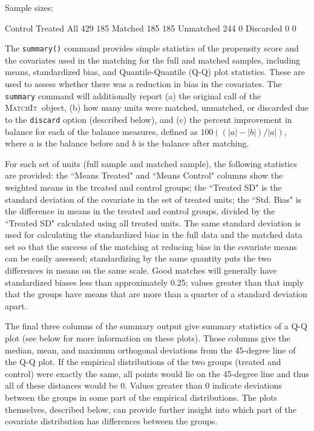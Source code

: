 \documentclass[oneside,letterpaper,titlepage]{article}
\newcommand{\MatchIt}{\textsc{MatchIt}}
\begin{document}
\begin{enumerate}
\begin{Schunk}
\begin{Soutput}
Sample sizes:

          Control Treated
All           429     185
Matched       185     185
Unmatched     244       0
Discarded       0       0
\end{Soutput}
\end{Schunk}

The \texttt{summary()} command provides simple statistics of the
propensity score and the covariates used in the matching for the full
and matched samples, including means, standardized bias, and
Quantile-Quantile (Q-Q) plot statistics.  These are used to assess
whether there was a reduction in bias in the covariates.  The
\texttt{summary} command will additionally report (a) the original
call of the \MatchIt\ object, (b) how many units were matched,
unmatched, or discarded due to the \texttt{discard} option (described
below), and (c) the percent improvement in balance for each of the
balance measures, defined as $100((|a|-|b|)/|a|)$, where $a$ is the
balance before and $b$ is the balance after matching.

For each set of units (full sample and matched sample), the following
statistics are provided: the ``Means Treated" and ``Means Control"
columns show the weighted means in the treated and control groups; the
``Treated SD" is the standard deviation of the covariate in the set of
treated units; the ``Std. Bias" is the difference in means in the
treated and control groups, divided by the ``Treated SD" calculated
using all treated units.  The same standard deviation is used for
calculating the standardized bias in the full data and the matched
data set so that the success of the matching at reducing bias in the
covariate means can be easily assessed; standardizing by the same
quantity puts the two differences in means on the same scale.  Good
matches will generally have standardized biases less than
approximately 0.25; values greater than that imply that the groups
have means that are more than a quarter of a standard deviation apart.

The final three columns of the summary output give summary statistics
of a Q-Q plot (see below for more information on these plots). Those
columns give the median, mean, and maximum orthogonal deviations from
the 45-degree line of the Q-Q plot.  If the empirical distributions of
the two groups (treated and control) were exactly the same, all points
would lie on the 45-degree line and thus all of these distances would
be 0.  Values greater than 0 indicate deviations between the groups in
some part of the empirical distributions.  The plots themselves,
described below, can provide further insight into which part of the
covariate distribution has differences between the groups.


\end{enumerate}
\end{document}
